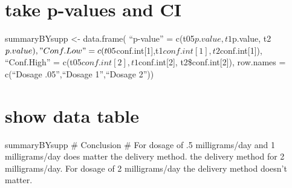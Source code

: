 \documentclass[
]{article}
\begin{document}
\hypertarget{take-p-values-and-ci}{%
\section{take p-values and CI}\label{take-p-values-and-ci}}

summaryBYsupp \textless- data.frame( ``p-value'' =
c(t05\(p.value, t1\)p.value,
t2\(p.value),  "Conf.Low" = c(t05\)conf.int{[}1{]},t1\(conf.int[1], t2\)conf.int{[}1{]}),
``Conf.High'' = c(t05\(conf.int[2],t1\)conf.int{[}2{]},
t2\$conf.int{[}2{]}), row.names = c(``Dosage .05'',``Dosage 1'',``Dosage
2''))

\hypertarget{show-data-table}{%
\section{show data table}\label{show-data-table}}

summaryBYsupp \# Conclusion \# For dosage of .5 milligrams/day and 1
milligrams/day does matter the delivery method. the delivery method for
2 milligrams/day. For dosage of 2 milligrams/day the delivery method
doesn't matter.
\end{document}
